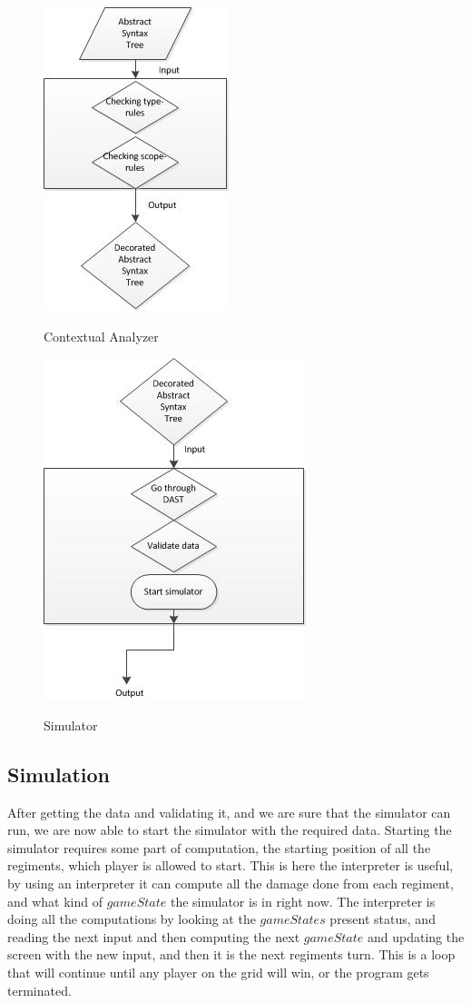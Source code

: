 \begin{figure}[H]
\centering
\includegraphics[scale=1]{rapport/6/figures/contextual_analyzer}
\label{fig:contextual_analyzer}
\caption{Contextual Analyzer}
\end{figure}

\begin{figure}[H]
\centering
\includegraphics[scale=1]{rapport/6/figures/simulator}
\label{fig:simulator}
\caption{Simulator}
\end{figure}


\subsection{Simulation}

After getting the data and validating it, and we are sure that the simulator can run, we are now able to start the simulator with the required data. 
Starting the simulator requires some part of computation, the starting position of all the regiments, which player is allowed to start. This is here the interpreter is useful, by using an interpreter it can compute all the damage done from each regiment, and what kind of $gameState$ the simulator is in right now. The interpreter is doing all the computations by looking at the $gameStates$ present status, and reading the next input and then computing the next $gameState$ and updating the screen with the new input, and then it is the next regiments turn. This is a loop that will continue until any player on the grid will win, or the program gets terminated.







